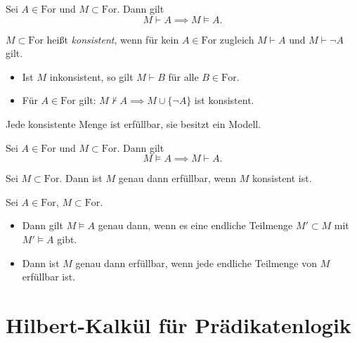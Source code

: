 \documentclass{cheat-sheet}
\newcommand{\For}{\mathrm{For}} %
\begin{document}

\begin{satz}[Korrektheitssatz]
  Sei $A \in \For$ und $M \subset \For$. Dann gilt
  \[ M \vdash A \implies M \models A. \]
\end{satz}

\begin{defn}
  $M \subset \For$ heißt \emph{konsistent}, wenn für kein $A \in \For$ zugleich $M \vdash A$ und $M \vdash \neg A$ gilt.
\end{defn}

\begin{lem}
  \begin{itemize}
    \item Ist $M$ inkonsistent, so gilt $M \vdash B$ für alle $B \in \For$.
    \item Für $A \in \For$ gilt: $M \not\vdash A \implies M \cup \{ \neg A \}$ ist konsistent.
  \end{itemize}
\end{lem}

\begin{lem}
  Jede konsistente Menge ist erfüllbar, \dh{} sie besitzt ein Modell.
\end{lem}

\begin{satz}[Vollständigkeitssatz]
  Sei $A \in \For$ und $M \subset \For$. Dann gilt
  \[ M \models A \implies M \vdash A. \]
\end{satz}

\begin{prop}
  Sei $M \subset \For$. Dann ist $M$ genau dann erfüllbar, wenn $M$ konsistent ist.
\end{prop}

\begin{samepage}

\begin{satz}
  Sei $A \in \For$, $M \subset \For$.
  \begin{itemize}
    \item Dann gilt $M \models A$ genau dann, wenn es eine endliche Teilmenge $M' \subset M$ mit $M' \models A$ gibt.
    \item Dann ist $M$ genau dann erfüllbar, wenn jede endliche Teilmenge von $M$ erfüllbar ist.
  \end{itemize}
\end{satz}

\section{Hilbert-Kalkül für Prädikatenlogik}
  
\end{samepage}
\end{document}
